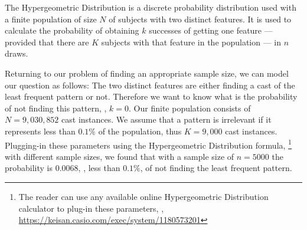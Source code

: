 The Hypergeometric Distribution is a discrete probability distribution used with a finite population of size $N$ of subjects with two distinct features.
It is used to calculate the probability of obtaining $k$ successes of getting one feature --- provided that there are $K$ subjects with that feature in the population --- in $n$ draws.

Returning to our problem of finding an appropriate sample size, we can model our question as follows:
The two distinct features are either finding a cast of the least frequent pattern or not.
Therefore we want to know what is the probability of not finding this pattern, \ie, $k = 0$.
Our finite population consists of $N = 9,030,852$ cast instances.
%
%
We assume that a pattern is irrelevant if it represents less than $0.1\%$ of the population, thus $K = 9,000$ cast instances.
Plugging-in these parameters using the Hypergeometric Distribution formula,%
\footnote{The reader can use any available online Hypergeometric Distribution calculator to plug-in these parameters, \eg, \url{https://keisan.casio.com/exec/system/1180573201}}
with different sample sizes, we found that with a sample size of $n = 5000$ the probability is $0.0068$, \ie, less than $0.1 \%$, of not finding the least frequent pattern.






